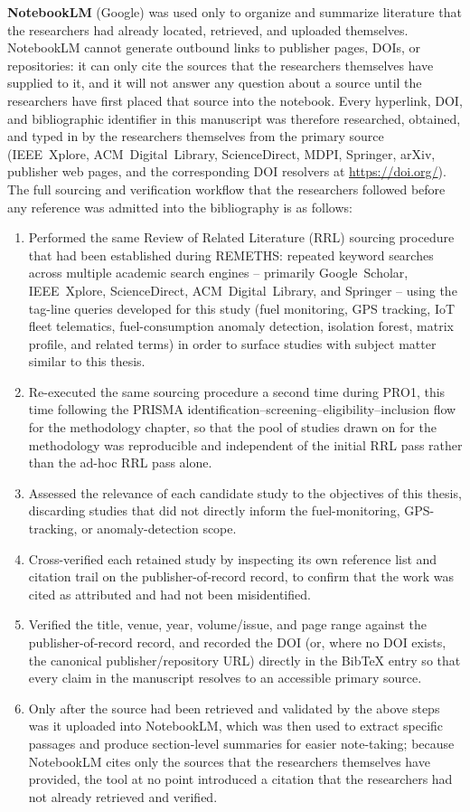\textbf{NotebookLM} (Google) was used only to organize and summarize literature that the researchers had already located, retrieved, and uploaded themselves. NotebookLM cannot generate outbound links to publisher pages, DOIs, or repositories: it can only cite the sources that the researchers themselves have supplied to it, and it will not answer any question about a source until the researchers have first placed that source into the notebook. Every hyperlink, DOI, and bibliographic identifier in this manuscript was therefore researched, obtained, and typed in by the researchers themselves from the primary source (IEEE~Xplore, ACM~Digital~Library, ScienceDirect, MDPI, Springer, arXiv, publisher web pages, and the corresponding DOI resolvers at \url{https://doi.org/}). The full sourcing and verification workflow that the researchers followed before any reference was admitted into the bibliography is as follows:
\begin{enumerate}
    \item Performed the same Review of Related Literature (RRL) sourcing procedure that had been established during REMETHS: repeated keyword searches across multiple academic search engines -- primarily Google~Scholar, IEEE~Xplore, ScienceDirect, ACM~Digital~Library, and Springer -- using the tag-line queries developed for this study (fuel monitoring, GPS tracking, IoT fleet telematics, fuel-consumption anomaly detection, isolation forest, matrix profile, and related terms) in order to surface studies with subject matter similar to this thesis.
    \item Re-executed the same sourcing procedure a second time during PRO1, this time following the PRISMA identification--screening--eligibility--inclusion flow for the methodology chapter, so that the pool of studies drawn on for the methodology was reproducible and independent of the initial RRL pass rather than the ad-hoc RRL pass alone.
    \item Assessed the relevance of each candidate study to the objectives of this thesis, discarding studies that did not directly inform the fuel-monitoring, GPS-tracking, or anomaly-detection scope.
    \item Cross-verified each retained study by inspecting its own reference list and citation trail on the publisher-of-record record, to confirm that the work was cited as attributed and had not been misidentified.
    \item Verified the title, venue, year, volume/issue, and page range against the publisher-of-record record, and recorded the DOI (or, where no DOI exists, the canonical publisher/repository URL) directly in the BibTeX entry so that every claim in the manuscript resolves to an accessible primary source.
    \item Only after the source had been retrieved and validated by the above steps was it uploaded into NotebookLM, which was then used to extract specific passages and produce section-level summaries for easier note-taking; because NotebookLM cites only the sources that the researchers themselves have provided, the tool at no point introduced a citation that the researchers had not already retrieved and verified.
\end{enumerate}
